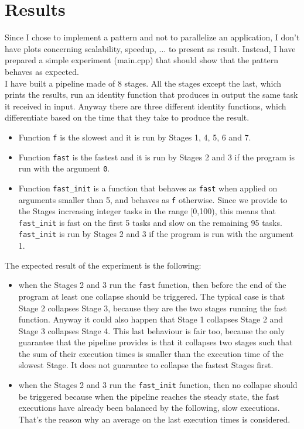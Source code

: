 \documentclass[12pt]{article}
\begin{document}
\section{Results}
Since I chose to implement a pattern and not to parallelize an application, I don't have plots concerning scalability, speedup, ... to present as result. Instead, I have prepared a simple  experiment (main.cpp) that should show that the pattern behaves as expected. \\
I have built a pipeline made of 8 stages. All the stages except the last, which prints the results,  run an identity function that produces in output the same task it received in input. Anyway there are three different identity functions, which differentiate based on the time that they take to produce the result. 
\begin{itemize}
\item Function \texttt{f} is the slowest and it is run by Stages 1, 4, 5, 6 and 7. 
\item Function \texttt{fast} is the fastest and it is run by Stages 2 and 3 if the program is run with the argument \texttt{0}. 
\item Function \texttt{fast\_init} is a function that behaves as \texttt{fast} when applied on arguments smaller than 5, and behaves as \texttt{f} otherwise. Since we provide to the Stages increasing integer tasks in the range [0,100), this means that \texttt{fast\_init} is fast on the first 5 tasks and slow on the remaining 95 tasks. \texttt{fast\_init} is run by Stages 2 and 3 if the program is run with the argument 1. 
\end{itemize}
The expected result of the experiment is the following: 
\begin{itemize}
\item when the Stages 2 and 3 run the \texttt{fast} function, then before the end of the program at least one collapse should be triggered. The typical case is that Stage 2 collapses Stage 3, because they are the two stages running the fast function. Anyway it could also happen that Stage 1 collapses Stage 2 and Stage 3 collapses Stage 4. This last behaviour is fair too, because the only guarantee that the pipeline provides is that it collapses two stages such that the sum of their execution times is smaller than the execution time of the slowest Stage. It does not guarantee to collapse the fastest Stages first.
\item when the Stages 2 and 3 run the \texttt{fast\_init} function, then no collapse should be triggered because when the pipeline reaches the steady state, the fast executions have already been balanced by the following, slow executions. That's the reason why an average on the last execution times is considered.
\end{itemize}
\end{document}
